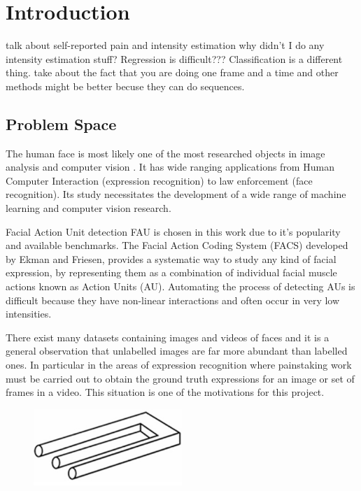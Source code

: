 \chapter{Introduction}
  talk about self-reported pain and intensity estimation
  why didn't I do any intensity estimation stuff?
  Regression is difficult??? Classification is a different thing.
  take about the fact that you are doing one frame and a time and
  other methods might be better becuse they can do sequences.
  \section{Problem Space}
    The human face is most likely one of the most researched objects in image analysis
    and computer vision \cite{S.ZafeiriouA.PapaioannouI.KotsiaM.A.Nicolaou}.
    It has wide ranging applications from Human
    Computer Interaction (expression recognition) to law enforcement (face recognition).
    Its study necessitates the development of a wide range of machine
    learning and computer vision research.

    Facial Action Unit detection FAU \cite{Corneanu2016} is chosen in this work due
    to it's popularity and available benchmarks.
    The Facial Action Coding System (FACS) developed by Ekman and Friesen,
    provides a systematic way to study any kind of facial expression,
    by representing them as a combination of individual facial muscle actions
    known as Action Units (AU). Automating the process of detecting AUs is difficult
    because they have non-linear interactions and often occur in very low intensities.

    There exist many datasets containing images and videos of faces and it is a general
    observation that unlabelled images are far more abundant than labelled ones.
    In particular in the areas of expression recognition where painstaking work
    must be carried out to obtain the ground truth expressions for an image or set of
    frames in a video. This situation is one of the motivations for this project.

    \begin{figure}
     \centering
     \includegraphics[width=0.5\textwidth]{figures/placeholder.jpg}
    \end{figure}

